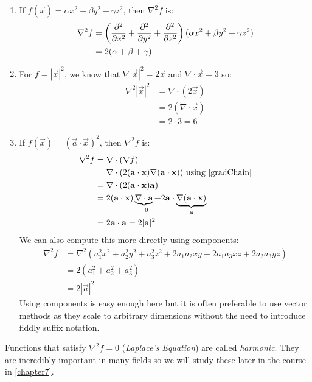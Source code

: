 \documentclass[../main.tex]{subfiles}
\begin{document}
\begin{example}
  \label{laplacianEx}
  \begin{enumerate}
    \item If $f(\vec{x}) = \alpha x^2 + \beta y^2 + \gamma z^2$, then $\nabla^2 f$ is:
      \begin{align*}
        \nabla^2 f &= \left(\pderiv[2]{}{x} + \pderiv[2]{}{y} + \pderiv[2]{}{z}\right)(\alpha x^2 + \beta y^2 + \gamma z^2) \\
                   &= 2(\alpha + \beta + \gamma)
      \end{align*}
    \item For $f = |\vec{x}|^2$, we know that $\nabla |\vec{x}|^2 = 2\vec{x}$ and $\nabla \cdot \vec{x} = 3$ so:
      \begin{align*}
        \nabla^2 |\vec{x}|^2 &= \nabla \cdot (2\vec{x}) \\
                             &= 2 (\nabla \cdot \vec{x}) \\
                             &= 2 \cdot 3 = 6
      \end{align*}
    \item If $f(\vec{x}) = (\vec{a} \cdot \vec{x})^2$, then $\nabla^2 f$ is:
      \begin{align*}
        \nabla^2 f &= \nabla \cdot (\nabla f)  \\
                   &= \nabla \cdot (2 (\vec{a} \cdot \vec{x}) \nabla(\vec{a} \cdot \vec{x})) \text{ using \cref{gradChain}} \\
                   &= \nabla \cdot (2(\vec{a} \cdot \vec{x}) \vec{a}) \\
                   &= 2(\vec{a} \cdot \vec{x}) \underbrace{\nabla \cdot \vec{a}}_{=0} + 2\vec{a} \cdot \underbrace{\nabla(\vec{a} \cdot \vec{x})}_{\vec{a}} \\
                   &= 2\vec{a} \cdot \vec{a} = 2|\vec{a}|^2
      \end{align*}
      We can also compute this more directly using components:
      \begin{align*}
        \nabla^2 f &= \nabla^2(a^2_1 x^2 + a^2_2 y^2 + a^2_3 z^2 + 2a_1a_2xy + 2a_1a_3xz + 2a_2a_3yz) \\
                   &= 2(a^2_1 + a^2_2 + a^2_3) \\
                   &= 2|\vec{a}|^2
      \end{align*}
      Using components is easy enough here but it is often preferable to use vector methods as they scale to arbitrary dimensions without the need to introduce fiddly suffix notation.
  \end{enumerate}
\end{example}
Functions that satisfy $\nabla^2 f = 0$ (\textit{Laplace's Equation}) are called \textit{harmonic}.
They are incredibly important in many fields so we will study these later in the course in \cref{chapter7}.
\end{document}
